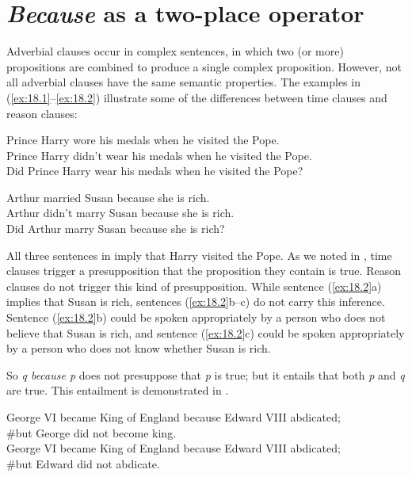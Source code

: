 \section{\textit{Because} as a two-place operator}\label{sec:18.2}

Adverbial clauses occur in complex sentences, in which two (or more) propositions are combined to produce a single complex proposition. However, not all adverbial clauses have the same semantic properties. The examples in (\ref{ex:18.1}--\ref{ex:18.2}) illustrate some of the differences between time clauses and reason clauses:


\ea \label{ex:18.1}
\ea  Prince Harry wore his medals when he visited the Pope.\\
\ex Prince Harry didn’t wear his medals when he visited the Pope.\\
\ex Did Prince Harry wear his medals when he visited the Pope?
                       \z
\z

\ea \label{ex:18.2}
\ea  Arthur married Susan because she is rich.\\
\ex Arthur didn’t marry Susan because she is rich.\\
\ex Did Arthur marry Susan because she is rich?
                       \z
\z


All three sentences in  imply that Harry visited the Pope. As we noted in , time clauses trigger a presupposition that the proposition they contain is true. Reason clauses do not trigger this kind of presupposition. While sentence (\ref{ex:18.2}a) implies that Susan is rich, sentences (\ref{ex:18.2}b--c) do not carry this inference. Sentence (\ref{ex:18.2}b) could be spoken appropriately by a person who does not believe that Susan is rich, and sentence (\ref{ex:18.2}c) could be spoken appropriately by a person who does not know whether Susan is rich.



So \textit{q because p} does not presuppose that \textit{p} is true; but it entails that both \textit{p} and \textit{q} are true. This entailment is demonstrated in .


\ea \label{ex:18.3}
\ea  George VI became King of England because Edward VIII abdicated;\\
  \#but George did not become king.\\
\ex George VI became King of England because Edward VIII abdicated;\\
  \#but Edward did not abdicate.
                       \z
\z



